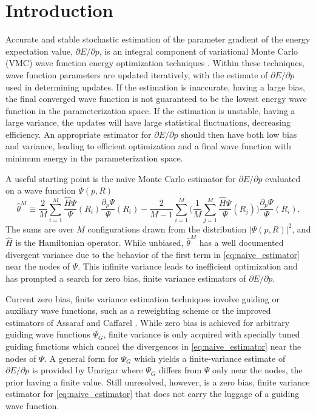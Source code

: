 \documentclass{article}
\begin{document}
\section{Introduction}
Accurate and stable stochastic estimation of the parameter gradient of the energy expectation value, $\partial E/\partial p$, is an integral component of variational Monte Carlo (VMC) wave function energy optimization techniques \cite{PhysRevB.64.024512, doi:10.1063/1.1604379, Toulouse2007}.
Within these techniques, wave function parameters are updated iteratively, with the estimate of $\partial E/\partial p$ used in determining updates.
If the estimation is inaccurate, having a large bias, the final converged wave function is not guaranteed to be the lowest energy wave function in the parameterization space.
If the estimation is unstable, having a large variance, the updates will have large statistical fluctuations, decreasing efficiency.
An appropriate estimator for $\partial E/ \partial p$ should then have both low bias and variance, leading to efficient optimization and a final wave function with minimum energy in the parameterization space.

A useful starting point is the naive Monte Carlo estimator for $\partial E/\partial p$ evaluated on a wave function $\Psi(p, R)$ 
\begin{equation}
\hat{\theta}^M \equiv \frac{2}{M}\sum_{i=1}^M \frac{\hat{H}\Psi}{\Psi}(R_i) \frac{\partial_p \Psi}{\Psi}(R_i) - \frac{2}{M-1} \sum_{i=1}^M \Big(\frac{1}{M} \sum_{j=1}^M \frac{\hat{H}\Psi}{\Psi}(R_j)\Big)\frac{\partial_p \Psi}{\Psi}(R_i). \label{eq:naive_estimator}
\end{equation}
The sums are over $M$ configurations drawn from the distribution $|\Psi(p, R)|^2$, and $\hat{H}$ is the Hamiltonian operator.
While unbiased, $\hat{\theta}^M$ has a well documented divergent variance \cite{Avella} due to the behavior of the first term in \eqref{eq:naive_estimator} near the nodes of $\Psi$.
This infinite variance leads to inefficient optimization and has prompted a search for zero bias, finite variance estimators of $\partial E/\partial p$.

Current zero bias, finite variance estimation techniques involve guiding or auxiliary wave functions, such as a reweighting scheme \cite{Avella, Attaccalite2008} or the improved estimators of Assaraf and Caffarel \cite{doi:10.1063/1.1286598, Assaraf2003}.
While zero bias is achieved for arbitrary guiding wave functions $\Psi_G$, finite variance is only acquired with specially tuned guiding functions which cancel the divergences in \eqref{eq:naive_estimator} near the nodes of $\Psi$.
A general form for $\Psi_G$ which yields a finite-variance estimate of $\partial E/\partial p$ is provided by Umrigar \cite{doi:10.1063/1.4933112} where $\Psi_G$ differs from $\Psi$ only near the nodes, the prior having a finite value.
Still unresolved, however, is a zero bias, finite variance estimator for \eqref{eq:naive_estimator} that does not carry the luggage of a guiding wave function.
\end{document}
